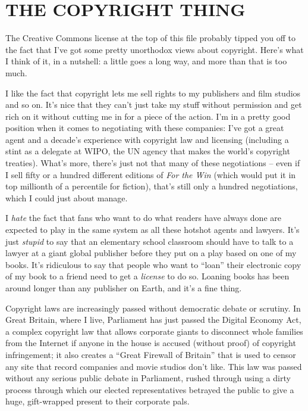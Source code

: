 \section{THE COPYRIGHT THING}

The Creative Commons license at the top of this file probably
tipped you off to the fact that I've got some pretty unorthodox
views about copyright. Here's what I think of it, in a nutshell: a
little goes a long way, and more than that is too much.

I like the fact that copyright lets me sell rights to my publishers
and film studios and so on. It's nice that they can't just take my
stuff without permission and get rich on it without cutting me in
for a piece of the action. I'm in a pretty good position when it
comes to negotiating with these companies: I've got a great agent
and a decade's experience with copyright law and licensing
(including a stint as a delegate at WIPO, the UN agency that makes
the world's copyright treaties). What's more, there's just not that
many of these negotiations -- even if I sell fifty or a hundred
different editions of \emph{For the Win} (which would put it in top
millionth of a percentile for fiction), that's still only a hundred
negotiations, which I could just about manage.

I \emph{hate} the fact that fans who want to do what readers have
always done are expected to play in the same system as all these
hotshot agents and lawyers. It's just \emph{stupid} to say that an
elementary school classroom should have to talk to a lawyer at a
giant global publisher before they put on a play based on one of my
books. It's ridiculous to say that people who want to ``loan'' their
electronic copy of my book to a friend need to get a \emph{license}
to do so. Loaning books has been around longer than any publisher
on Earth, and it's a fine thing.

Copyright laws are increasingly passed without democratic debate or
scrutiny. In Great Britain, where I live, Parliament has just
passed the Digital Economy Act, a complex copyright law that allows
corporate giants to disconnect whole families from the Internet if
anyone in the house is accused (without proof) of copyright
infringement; it also creates a ``Great Firewall of Britain'' that is
used to censor any site that record companies and movie studios
don't like. This law was passed without any serious public debate
in Parliament, rushed through using a dirty process through which
our elected representatives betrayed the public to give a huge,
gift-wrapped present to their corporate pals.

